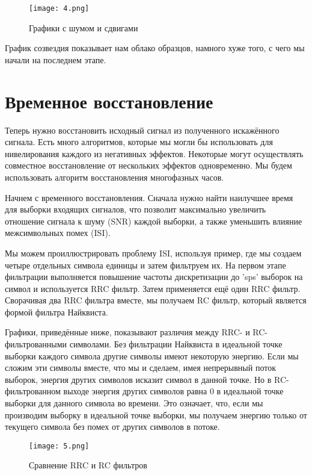 \documentclass[a4paper,12pt]{report}
\begin{document}
\begin{figure}[H]
        \centering
        \texttt{[image: 4.png]}
        \caption{Графики с шумом и сдвигами}
        \label{fig:ig4_1}
\end{figure}

График созвездия показывает нам облако образцов, намного хуже того, с чего мы начали на последнем этапе.

\section{Временное восстановление}

Теперь нужно восстановить исходный сигнал из полученного искажённого сигнала. Есть много алгоритмов, которые мы могли бы использовать для нивелирования каждого из негативных эффектов. Некоторые могут осуществлять совместное восстановление от нескольких эффектов одновременно. Мы будем использовать алгоритм восстановления многофазных часов. 

Начнем с временного восстановления. Сначала нужно найти наилучшее время для выборки входящих сигналов, что позволит максимально увеличить отношение сигнала к шуму (SNR) каждой выборки, а также уменьшить влияние межсимвольных помех (ISI). 

Мы можем проиллюстрировать проблему ISI, используя пример, где мы создаем четыре отдельных символа единицы и затем фильтруем их. На первом этапе фильтрации выполняется повышение частоты дискретизации до 'sps’ выборок на символ и используется RRC фильтр. Затем применяется ещё один RRC фильтр. Сворачивая два RRC фильтра вместе, мы получаем RC фильтр, который является формой фильтра Найквиста. 

Графики, приведённые ниже, показывают различия между RRC- и RC-фильтрованными символами. Без фильтрации Найквиста в идеальной точке выборки каждого символа другие символы имеют некоторую энергию. Если мы сложим эти символы вместе, что мы и сделаем, имея непрерывный поток выборок, энергия других символов исказит символ в данной точке. Но в RC-фильтрованном выходе энергия других символов равна 0 в идеальной точке выборки для данного символа во времени. Это означает, что, если мы производим выборку в идеальной точке выборки, мы получаем энергию только от текущего символа без помех от других символов в потоке. 

\begin{figure}[H]
        \centering
        \texttt{[image: 5.png]}
        \caption{Сравнение RRC и RC фильтров}
        \label{fig:ig4_1}
\end{figure}
\end{document}
